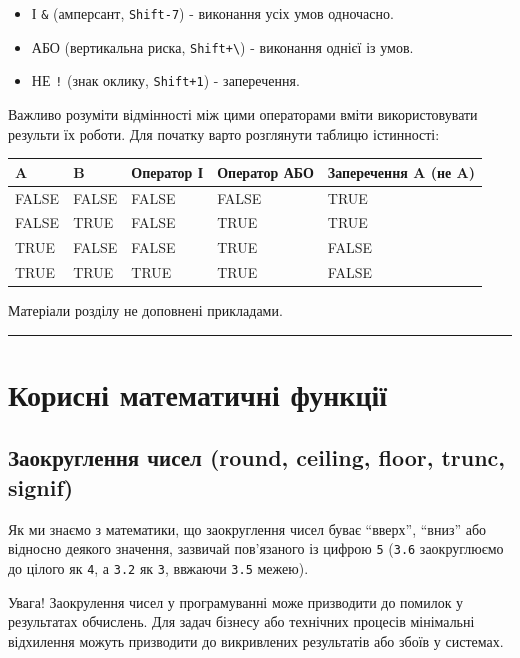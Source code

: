 \documentclass[
]{book}
\providecommand{\tightlist}{%
  \setlength{\itemsep}{0pt}\setlength{\parskip}{0pt}}
\begin{document}
\begin{itemize}
\tightlist
\item
  І \texttt{\&} (амперсант, \texttt{Shift-7}) - виконання усіх умов одночасно.
\item
  АБО \texttt{\textbar{}} (вертикальна риска, \texttt{Shift+\textbackslash{}}) - виконання однієї із умов.
\item
  НЕ \texttt{!} (знак оклику, \texttt{Shift+1}) - заперечення.
\end{itemize}

Важливо розуміти відмінності між цими операторами вміти використовувати результи їх роботи. Для початку варто розглянути таблицю істинності:

\begin{longtable}[]{@{}lllll@{}}
\toprule
A & B & Оператор \textbf{І} & Оператор \textbf{АБО} & Заперечення A (\textbf{не A})\tabularnewline
\midrule
\endhead
FALSE & FALSE & FALSE & FALSE & TRUE\tabularnewline
FALSE & TRUE & FALSE & TRUE & TRUE\tabularnewline
TRUE & FALSE & FALSE & TRUE & FALSE\tabularnewline
TRUE & TRUE & TRUE & TRUE & FALSE\tabularnewline
\bottomrule
\end{longtable}

Матеріали розділу не доповнені прикладами.

\begin{center}\rule{0.5\linewidth}{0.5pt}\end{center}

\hypertarget{chapter24}{%
\section{Корисні математичні функції}\label{chapter24}}

\hypertarget{chapter241}{%
\subsection{Заокруглення чисел (round, ceiling, floor, trunc, signif)}\label{chapter241}}

Як ми знаємо з математики, що заокруглення чисел буває ``вверх'', ``вниз'' або відносно деякого значення, зазвичай пов'язаного із цифрою \texttt{5} (\texttt{3.6} заокруглюємо до цілого як \texttt{4}, а \texttt{3.2} як \texttt{3}, ввжаючи \texttt{3.5} межею).

Увага! Заокрулення чисел у програмуванні може призводити до помилок у результатах обчислень. Для задач бізнесу або технічних процесів мінімальні відхилення можуть призводити до викривлених результатів або збоїв у системах.
\end{document}
